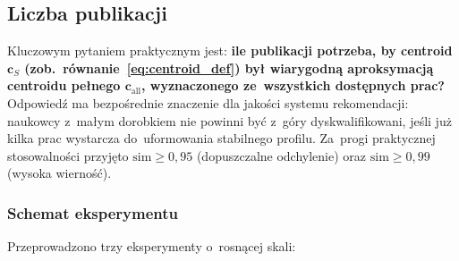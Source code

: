 
\subsection{Liczba publikacji}
\label{subsec:stability_numpubs}

Kluczowym pytaniem praktycznym jest: \textbf{ile publikacji potrzeba,
by centroid $\mathbf{c}_S$ (zob.\ równanie~\ref{eq:centroid_def})
był wiarygodną aproksymacją centroidu pełnego $\mathbf{c}_\mathrm{all}$,
wyznaczonego ze~wszystkich dostępnych prac?}
Odpowiedź ma bezpośrednie znaczenie dla jakości systemu rekomendacji:
naukowcy z~małym dorobkiem nie powinni być z~góry dyskwalifikowani,
jeśli już kilka prac wystarcza do~uformowania stabilnego profilu.
Za~progi praktycznej stosowalności przyjęto
$\mathrm{sim} \geq 0{,}95$ (dopuszczalne odchylenie)
oraz $\mathrm{sim} \geq 0{,}99$ (wysoka wierność).

\subsubsection{Schemat eksperymentu}

Przeprowadzono trzy eksperymenty o~rosnącej skali:

